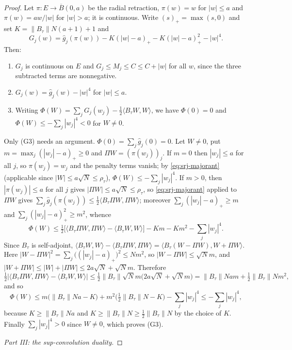 \begin{proof}
Let $\pi:E\to\overline B(0,a)$ be the radial retraction, $\pi(w)=w$ for
$|w|\le a$ and $\pi(w)=aw/|w|$ for $|w|>a$; it is continuous. Write
$(s)_+=\max(s,0)$ and set $K=\|B_\tau\|N(a+1)+1$ and
\[
  G_j(w)=\widehat g_j(\pi(w))-K(|w|-a)_+-K(|w|-a)_+^2-|w|^4 .
\]
Then:
\begin{enumerate}
\item[(G1)] $G_j$ is continuous on $E$ and $G_j\le M_j\le C\le C+|w|$ for all
$w$, since the three subtracted terms are nonnegative.
\item[(G2)] $G_j(w)=\widehat g_j(w)-|w|^4$ for $|w|\le a$.
\item[(G3)] Writing $\Phi(W)=\sum_jG_j(w_j)-\tfrac12\langle B_\tau W,W\rangle$, we
have $\Phi(0)=0$ and $\Phi(W)\le-\sum_j|w_j|^4<0$ for $W\ne0$.
\end{enumerate}
Only (G3) needs an argument. $\Phi(0)=\sum_j\widehat g_j(0)=0$. Let $W\ne0$,
put $m=\max_j(|w_j|-a)_+\ge0$ and $\Pi W=(\pi(w_j))_j$. If $m=0$ then
$|w_j|\le a$ for all $j$, so $\pi(w_j)=w_j$ and the penalty terms vanish; by
\eqref{eq:srj-majorant} (applicable since $|W|\le a\sqrt N\le\rho_\tau$),
$\Phi(W)\le-\sum_j|w_j|^4$. If $m>0$, then $|\pi(w_j)|\le a$ for all $j$ gives
$|\Pi W|\le a\sqrt N\le\rho_\tau$, so \eqref{eq:srj-majorant} applied to
$\Pi W$ gives $\sum_j\widehat g_j(\pi(w_j))\le\tfrac12\langle B_\tau\Pi W,\Pi
W\rangle$; moreover $\sum_j(|w_j|-a)_+\ge m$ and
$\sum_j(|w_j|-a)_+^2\ge m^2$, whence
\[
  \Phi(W)\le\tfrac12\bigl[\langle B_\tau\Pi W,\Pi W\rangle
     -\langle B_\tau W,W\rangle\bigr]-Km-Km^2-\sum_j|w_j|^4 .
\]
Since $B_\tau$ is self-adjoint,
$\langle B_\tau W,W\rangle-\langle B_\tau\Pi W,\Pi W\rangle
=\langle B_\tau(W-\Pi W),W+\Pi W\rangle$. Here
$|W-\Pi W|^2=\sum_j\bigl((|w_j|-a)_+\bigr)^2\le Nm^2$, so
$|W-\Pi W|\le\sqrt Nm$, and $|W+\Pi W|\le|W|+|\Pi W|\le2a\sqrt N+\sqrt Nm$.
Therefore
\[
  \tfrac12\bigl|\langle B_\tau\Pi W,\Pi W\rangle-\langle B_\tau W,W\rangle\bigr|
   \le\tfrac12\|B_\tau\|\sqrt Nm\bigl(2a\sqrt N+\sqrt Nm\bigr)
   =\|B_\tau\|Nam+\tfrac12\|B_\tau\|Nm^2,
\]
and so
\[
  \Phi(W)\le m\bigl(\|B_\tau\|Na-K\bigr)+m^2\bigl(\tfrac12\|B_\tau\|N-K\bigr)
     -\sum_j|w_j|^4\le-\sum_j|w_j|^4,
\]
because $K\ge\|B_\tau\|Na$ and $K\ge\|B_\tau\|N\ge\tfrac12\|B_\tau\|N$ by the
choice of $K$. Finally $\sum_j|w_j|^4>0$ since $W\ne0$, which proves (G3).

\medskip\noindent\emph{Part III: the sup-convolution duality.}


\end{proof}
